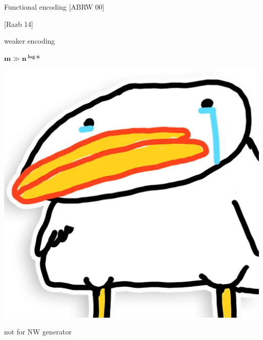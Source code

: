 \begin{frame}{Functional encoding [ABRW 00]}
\begin{minipage}[t][3cm][t]{0.32\linewidth}
        \vspace{0.2cm}
        [Razb 14]

        \pause
        \vspace{0.1cm}
        \alert{weaker encoding}
    \end{minipage}
    \pause
    \begin{minipage}[t][3cm][t]{0.32\linewidth}
        \centering
        $\mathbf{m \gg n^{\log n}}$

        \pause
        \vspace{0.2cm}
        \includegraphics[scale = 0.05]{pics/utia-cry.png}

        \pause
        \vspace{0.1cm}
        \alert{not for NW generator}
    \end{minipage}
\end{frame}


